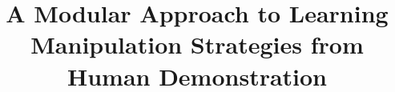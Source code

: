 

\documentclass[twocolumn]{svjour3}          %
%
\smartqed  %
%
\usepackage{amssymb}
\usepackage{caption}
\usepackage{slashbox}
\usepackage{graphics} %
\usepackage{epsfig} %
\usepackage{epstopdf}
\usepackage{subfig}
\usepackage{mathptmx} %
\usepackage{amsmath} %
\usepackage{amsmath}
\usepackage{array}
\usepackage{bm}
\usepackage{multirow}
\usepackage[usenames,dvipsnames,svgnames,table]{xcolor}
\usepackage{pbox}
\usepackage{hyperref}
\usepackage{algorithm}
\usepackage{algpseudocode}
\usepackage{natbib}
\usepackage[misc]{ifsym}
\usepackage{xcolor}


\sloppy

\title{A Modular Approach to Learning Manipulation Strategies from
  Human Demonstration}

